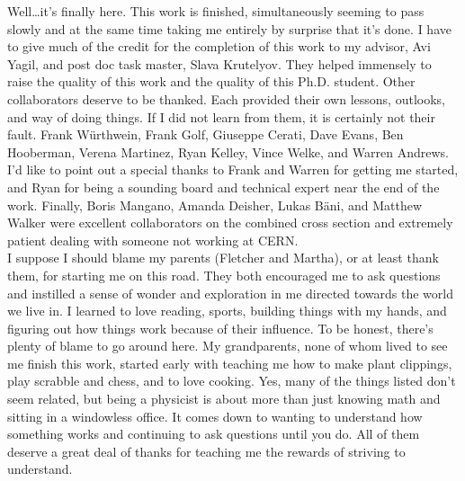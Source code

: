 \begin{frontmatter}
\begin{acknowledgements}                                                       
Well\ldots it's finally here. This work is finished, simultaneously seeming to pass slowly and at the same time taking me entirely by surprise that it's done. I have to give much of the credit for the completion of this work to my advisor, Avi Yagil, and post doc task master, Slava Krutelyov. They helped immensely to raise the quality of this work and the quality of this Ph.D. student. Other collaborators deserve to be thanked. Each provided their own lessons, outlooks, and way of doing things. If I did not learn from them, it is certainly not their fault. Frank W\"urthwein, Frank Golf, Giuseppe Cerati, Dave Evans, Ben Hooberman, Verena Martinez, Ryan Kelley, Vince Welke, and Warren Andrews.  I'd like to point out a special thanks to Frank and Warren for getting me started, and Ryan for being a sounding board and technical expert near the end of the work. Finally, Boris Mangano, Amanda Deisher, Lukas B\"ani, and Matthew Walker were excellent collaborators on the combined cross section and extremely patient dealing with someone not working at CERN. \\

I suppose I should blame my parents (Fletcher and Martha), or at least thank them, for starting me on this road. They both encouraged me to ask questions and instilled a sense of wonder and exploration in me directed towards the world we live in. I learned to love reading, sports, building things with my hands, and figuring out how things work because of their influence. To be honest, there's plenty of blame to go around here. My grandparents, none of whom lived to see me finish this work, started early with teaching me how to make plant clippings, play scrabble and chess, and to love cooking. Yes, many of the things listed don't seem related, but being a physicist is about more than just knowing math and sitting in a windowless office. It comes down to wanting to understand how something works and continuing to ask questions until you do. All of them deserve a great deal of thanks for teaching me the rewards of striving to understand.\\


\end{acknowledgements}
\end{frontmatter}
